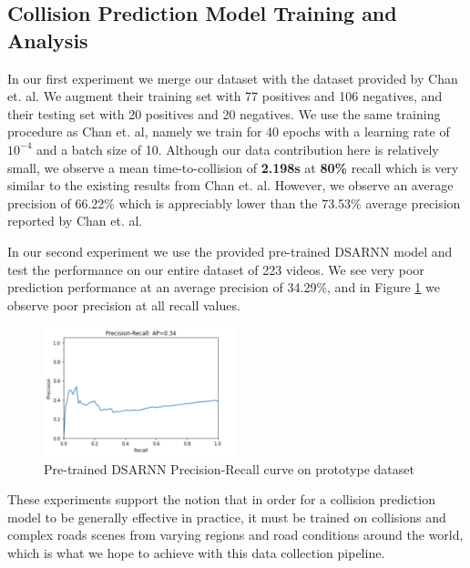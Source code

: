 \documentclass[letterpaper, 10 pt, conference]{ieeeconf}
\newcommand{\todo}[1]{{\color{red}#1}}
\begin{document}
\subsection{Collision Prediction Model Training and Analysis}
\label{section-collision-prediction}
In our first experiment we merge our dataset with the dataset provided by Chan et. al. We augment their training set with 77 positives and 106 negatives, and their testing set with 20 positives and 20 negatives. We use the same training procedure as Chan et. al, namely we train for 40 epochs with a learning rate of $10^{-4}$ and a batch size of 10. Although our data contribution here is relatively small, we observe a mean time-to-collision of \textbf{2.198s} at \textbf{80\%} recall which is very similar to the existing results from Chan et. al. However, we observe an average precision of 66.22\% which is appreciably lower than the 73.53\% average precision reported by Chan et. al. \cite{chan2016anticipating}

In our second experiment we use the provided pre-trained DSARNN model and test the performance on our entire dataset of 223 videos. We see very poor prediction performance at an average precision of 34.29\%, and in Figure \ref{fig:pr_curve} we observe poor precision at all recall values.

\begin{figure}[!htbp]
		\centering
		\includegraphics[width=0.5\textwidth]{prcurve.png}
		\caption{Pre-trained DSARNN Precision-Recall curve on prototype dataset}
		\label{fig:pr_curve}
\end{figure}

These experiments support the notion that in order for a collision prediction model to be generally effective in practice, it must be trained on collisions and complex roads scenes from varying regions and road conditions around the world, which is what we hope to achieve with this data collection pipeline.

\end{document}
